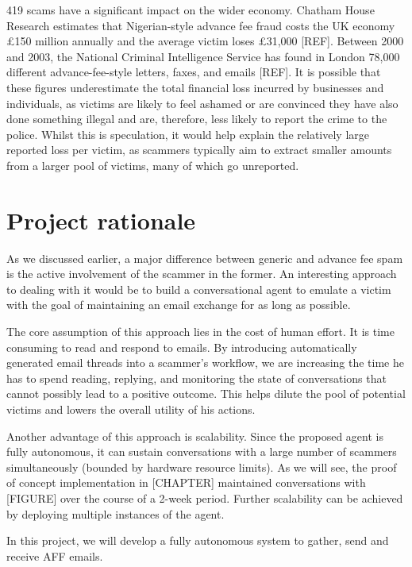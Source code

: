 419 scams have a significant impact on the wider economy. Chatham House Research estimates that Nigerian-style advance fee fraud costs the UK economy £150 million annually and the average victim loses £31,000 [REF]. Between 2000 and 2003, the National Criminal Intelligence Service has found in London 78,000 different advance-fee-style letters, faxes, and emails [REF]. It is possible that these figures underestimate the total financial loss incurred by businesses and individuals, as victims are likely to feel ashamed or are convinced they have also done something illegal and are, therefore, less likely to report the crime to the police. Whilst this is speculation, it would help explain the relatively large reported loss per victim, as scammers typically aim to extract smaller amounts from a larger pool of victims, many of which go unreported.

\section{Project rationale}
As we discussed earlier, a major difference between generic and advance fee spam is the active involvement of the scammer in the former. An interesting approach to dealing with it would be to build a conversational agent to emulate a victim with the goal of maintaining an email exchange for as long as possible.

The core assumption of this approach lies in the cost of human effort. It is time consuming to read and respond to emails. By introducing automatically generated email threads into a scammer's workflow, we are increasing the time he has to spend reading, replying, and monitoring the state of conversations that cannot possibly lead to a positive outcome. This helps dilute the pool of potential victims and lowers the overall utility of his actions.

Another advantage of this approach is scalability. Since the proposed agent is fully autonomous, it can sustain conversations with a large number of scammers simultaneously (bounded by hardware resource limits). As we will see, the proof of concept implementation in [CHAPTER] maintained conversations with [FIGURE] over the course of a 2-week period. Further scalability can be achieved by deploying multiple instances of the agent.

In this project, we will develop a fully autonomous system to gather, send and receive AFF emails.